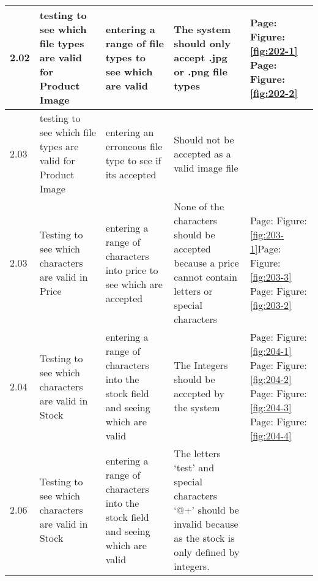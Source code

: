 \begin{flushleft}
\begin{longtable}{|p{1cm}|p{2.5cm}|p{2.5cm}|p{2cm}|p{2cm}|}
	2.02 & testing to see which file types are valid for Product Image & entering a range of file types to see which are valid & The system should only accept .jpg or .png file types &  Page:\pageref{fig:202-1}  \newline Figure:\ref{fig:202-1} \newline  \newline   Page:\pageref{fig:202-2}  \newline Figure:\ref{fig:202-2} \\ \hline
	\rowcolor{dark-grey}2.03 & testing to see which file types are valid for Product Image & entering an erroneous file type to see if its accepted &  Should not be accepted as a valid image file & \\ \hline
	2.03 & Testing to see which characters are valid in Price & entering a range of characters into price to see which are accepted &  None of the characters should be accepted because a price cannot contain letters or special characters &  Page:\pageref{fig:203-1}  \newline Figure:\ref{fig:203-1}\newline  \newline Page:\pageref{fig:203-3}  \newline Figure:\ref{fig:203-3}  \newline  \newline Page:\pageref{fig:203-2}  \newline Figure:\ref{fig:203-2}  \\ \hline
	2.04 & Testing to see which characters are valid in Stock & entering a range of characters into the stock field and seeing which are valid  & The Integers should be accepted by the system & Page:\pageref{fig:204-1}  \newline Figure:\ref{fig:204-1}    \newline  \newline Page:\pageref{fig:204-2}  \newline Figure:\ref{fig:204-2}  \newline  \newline Page:\pageref{fig:204-3}  \newline Figure:\ref{fig:204-3}  \newline  \newline Page:\pageref{fig:204-4}  \newline Figure:\ref{fig:204-4} \\ \hline
	\rowcolor{dark-grey}2.06 & Testing to see which characters are valid in Stock & entering a range of characters into the stock field and seeing which are valid  & The letters `test' and special characters `@+' should be invalid because as the stock is only defined by integers. & \\ \hline

\end{longtable}
\end{flushleft}
